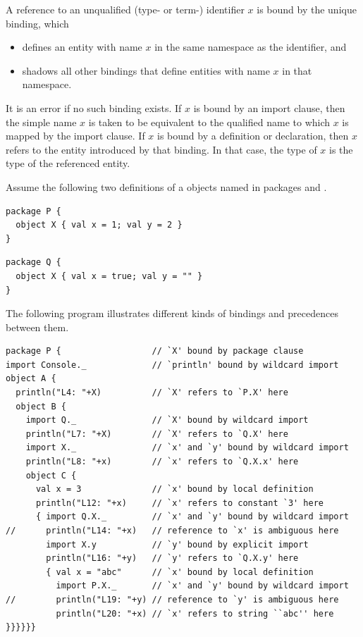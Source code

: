 A reference to an unqualified (type- or term-) identifier $x$ is bound
by the unique binding, which
\begin{itemize}
\item defines an entity with name $x$ in the same namespace as the
identifier, and
\item shadows all other bindings that define entities with name $x$ in that namespace.
\end{itemize}
It is an error if no such binding exists.  If $x$ is bound by an
import clause, then the simple name $x$ is taken to be equivalent to
the qualified name to which $x$ is mapped by the import clause. If $x$
is bound by a definition or declaration, then $x$ refers to the entity
introduced by that binding. In that case, the type of $x$ is the type
of the referenced entity.

\example Assume the following two definitions of a objects named \lstinline@X@ in packages \lstinline@P@ and \lstinline@Q@.
\begin{lstlisting}
package P {
  object X { val x = 1; val y = 2 }
}
\end{lstlisting}
\begin{lstlisting}
package Q {
  object X { val x = true; val y = "" }
}
\end{lstlisting}
The following program illustrates different kinds of bindings and
precedences between them.
\begin{lstlisting}
package P {                  // `X' bound by package clause
import Console._             // `println' bound by wildcard import
object A {                   
  println("L4: "+X)          // `X' refers to `P.X' here
  object B {
    import Q._               // `X' bound by wildcard import
    println("L7: "+X)        // `X' refers to `Q.X' here
    import X._               // `x' and `y' bound by wildcard import
    println("L8: "+x)        // `x' refers to `Q.X.x' here
    object C {
      val x = 3              // `x' bound by local definition
      println("L12: "+x)     // `x' refers to constant `3' here
      { import Q.X._         // `x' and `y' bound by wildcard import
//      println("L14: "+x)   // reference to `x' is ambiguous here
        import X.y           // `y' bound by explicit import
        println("L16: "+y)   // `y' refers to `Q.X.y' here
        { val x = "abc"      // `x' bound by local definition
          import P.X._       // `x' and `y' bound by wildcard import
//        println("L19: "+y) // reference to `y' is ambiguous here
          println("L20: "+x) // `x' refers to string ``abc'' here
}}}}}}
\end{lstlisting}

